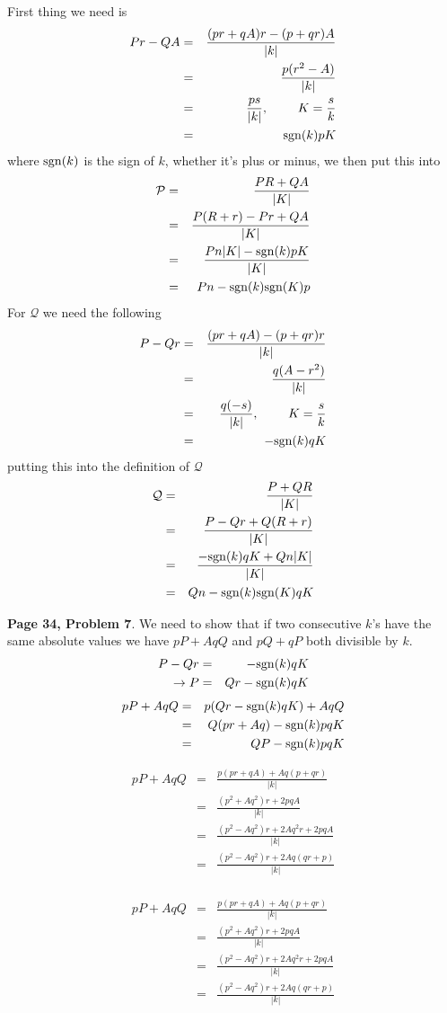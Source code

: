 \documentclass[aps,preprint,preprintnumbers,nofootinbib,showpacs,prd]{revtex4-1}
\newcommand{\nbea}{\begin{eqnarray*}}
\newcommand{\neea}{\end{eqnarray*}}
\begin{document}
First thing we need is
%
\nbea
Pr - QA & = & \frac{(pr + qA)r - (p + qr)A}{|k|} \\
& = & \frac{p(r^2 - A)}{|k|} \\
& = & \frac{ps}{|k|}, ~~~~~~~ K = \frac{s}{k} \\
& = & {\rm sgn}(k) pK
\neea
%
where ${\rm sgn}(k)$ is the sign of $k$, whether it's plus or minus, we then put this into
%
\nbea
\mathcal{P} & = & \frac{PR + QA}{|K|} \\
& = & \frac{P(R + r) - Pr + QA}{|K|} \\
& = & \frac{Pn|K| - {\rm sgn}(k) pK}{|K|} \\
& = & Pn - {\rm sgn}(k) {\rm sgn}(K) p
\neea
%
For $\mathcal{Q}$ we need the following
%
\nbea
P -Qr & = & \frac{(pr + qA) - (p + qr)r}{|k|} \\
& = & \frac{q(A-r^2)}{|k|} \\
& = & \frac{q(-s)}{|k|}, ~~~~~~~ K = \frac{s}{k} \\
& = & -{\rm sgn}(k)q K
\neea
%
putting this into the definition of $\mathcal{Q}$
%
\nbea
\mathcal{Q} & = & \frac{P + QR}{|K|} \\
& = & \frac{P - Qr + Q(R + r)}{|K|} \\
& = & \frac{-{\rm sgn}(k) qK + Qn|K|}{|K|} \\
& = & Qn - {\rm sgn}(k){\rm sgn}(K) qK
\neea
%

{\bf Page 34, Problem 7}. We need to show that if two consecutive $k$'s have the same absolute values we have $pP + AqQ$ and $pQ + qP$ both divisible by $k$.
%
\nbea
P -Qr & = & -{\rm sgn}(k)q K \\
\to P & = & Qr -{\rm sgn}(k)q K
\neea
%
%
\nbea
pP + AqQ & = & p(Qr -{\rm sgn}(k)q K) + AqQ \\
& = & Q(pr + Aq) - {\rm sgn}(k)pq K \\
& = & QP - {\rm sgn}(k)pq K \\
\neea
%

%
\nbea
pP + AqQ & = & \frac{p(pr + qA) + Aq(p + qr)}{|k|} \\
& = & \frac{(p^2 + Aq^2)r + 2pqA}{|k|} \\
& = & \frac{(p^2 - Aq^2)r + 2 Aq^2r + 2pqA}{|k|} \\
& = & \frac{(p^2 - Aq^2)r + 2 Aq(qr + p)}{|k|} \\
\neea
%

%
\nbea
pP + AqQ & = & \frac{p(pr + qA) + Aq(p + qr)}{|k|} \\
& = & \frac{(p^2 + Aq^2)r + 2pqA}{|k|} \\
& = & \frac{(p^2 - Aq^2)r + 2 Aq^2r + 2pqA}{|k|} \\
& = & \frac{(p^2 - Aq^2)r + 2 Aq(qr + p)}{|k|} \\
\neea
%
\end{document}
